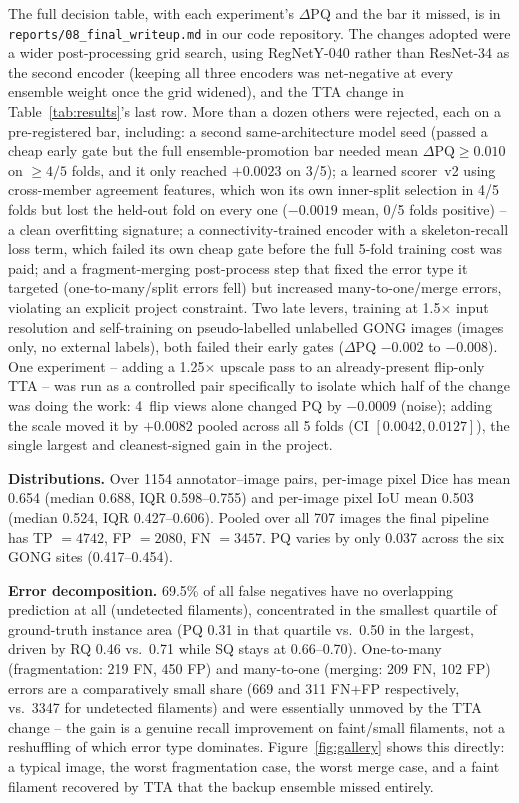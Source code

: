 \documentclass[sigconf]{acmart}
\begin{document}
    The full decision table, with each experiment's $\Delta$PQ and the bar it missed, is in
    \texttt{reports/08\_final\_writeup.md} in our code repository. The changes adopted were a wider
    post-processing grid search, using RegNetY-040 rather than ResNet-34 as the second encoder (keeping
    all three encoders was net-negative at every ensemble weight once the grid widened), and the TTA change in
    Table~\ref{tab:results}'s last row. More than a dozen others were rejected, each on a pre-registered
    bar, including: a second same-architecture
    model seed (passed a cheap early gate but the full ensemble-promotion bar needed mean
    $\Delta\text{PQ}\geq0.010$ on $\geq4/5$ folds, and it only reached $+0.0023$ on 3/5); a learned
    scorer~v2 using cross-member agreement features, which won its own inner-split selection in 4/5
    folds but lost the held-out fold on every one ($-0.0019$ mean, 0/5 folds positive) -- a clean
    overfitting signature; a connectivity-trained encoder with a skeleton-recall loss term, which failed
    its own cheap gate before the full 5-fold training cost was paid; and a fragment-merging
    post-process step that fixed the error type it targeted (one-to-many/split errors fell) but
    increased many-to-one/merge errors, violating an explicit project constraint. Two late levers, training
    at 1.5$\times$ input resolution and self-training on pseudo-labelled unlabelled GONG images (images
    only, no external labels), both failed their early gates ($\Delta$PQ $-0.002$ to $-0.008$). One experiment --
    adding a 1.25$\times$ upscale pass to an already-present flip-only TTA -- was run as a controlled
    pair specifically to isolate which half of the change was doing the work: 4~flip views alone changed
    PQ by $-0.0009$ (noise); adding the scale moved it by $+0.0082$ pooled across all 5 folds (CI
    $[0.0042, 0.0127]$), the single largest and cleanest-signed gain in the project.

    \textbf{Distributions.} Over 1154 annotator--image pairs, per-image pixel Dice has mean 0.654
    (median 0.688, IQR 0.598--0.755) and per-image pixel IoU mean 0.503 (median 0.524, IQR 0.427--0.606).
    Pooled over all 707 images the final pipeline has TP $=4742$, FP $=2080$, FN $=3457$. PQ varies
    by only 0.037 across the six GONG sites (0.417--0.454).

    \textbf{Error decomposition.} 69.5\% of all false negatives have no
    overlapping prediction at all (undetected filaments), concentrated in the smallest quartile of
    ground-truth instance area (PQ 0.31 in that quartile vs.\ 0.50 in the largest, driven by RQ
    0.46 vs.\ 0.71 while SQ stays at 0.66--0.70). One-to-many
    (fragmentation: 219 FN, 450 FP) and many-to-one (merging: 209 FN, 102 FP) errors are a comparatively
    small share (669 and 311 FN+FP respectively, vs.\ 3347 for undetected filaments) and were essentially unmoved by the
    TTA change -- the gain is a genuine recall improvement on faint/small filaments, not a reshuffling of
    which error type dominates. Figure~\ref{fig:gallery} shows this directly: a typical image, the
    worst fragmentation case, the worst merge case, and a faint filament recovered by TTA that the
    backup ensemble missed entirely.
\end{document}
